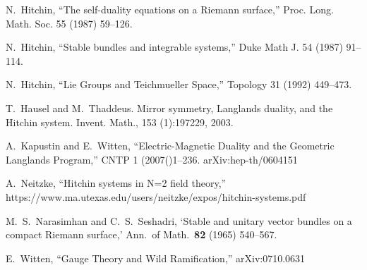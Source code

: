 \documentclass[oneside,english]{amsbook}
\numberwithin{section}{chapter}
\numberwithin{equation}{section}
\numberwithin{figure}{section}
\theoremstyle{plain}
\theoremstyle{definition}
\theoremstyle{remark}
\theoremstyle{definition}
\theoremstyle{definition}
\theoremstyle{plain}
\begin{document}
\begin{thebibliography}{AB}
N.~Hitchin, ``The self-duality equations on a Riemann
surface,'' Proc. Long. Math. Soc. 55 (1987) 59--126.

N.~Hitchin, ``Stable bundles and integrable systems,''
Duke Math J. 54 (1987) 91--114.

N.~Hitchin, ``Lie Groups and Teichmueller Space,''
Topology 31 (1992) 449--473.

T.~Hausel and M.~Thaddeus. Mirror symmetry, Langlands
duality, and the Hitchin system. Invent. Math., 153 (1):197\textendash{}229,
2003.

A.~Kapustin and E.~Witten, ``Electric-Magnetic
Duality and the Geometric Langlands Program,'' CNTP 1 (2007()1--236.
arXiv:hep-th/0604151

A.~Neitzke, ``Hitchin systems in N=2 field theory,''
https://www.ma.utexas.edu/users/neitzke/expos/hitchin-systems.pdf

M.~S.~Narasimhan and C.~S.~Seshadri, `Stable
and unitary vector bundles on a compact Riemann surface,' Ann.~of
Math.~\textbf{82} (1965) 540--567.

E.~Witten, ``Gauge Theory and Wild Ramification,''
arXiv:0710.0631\end{thebibliography}
\end{document}
